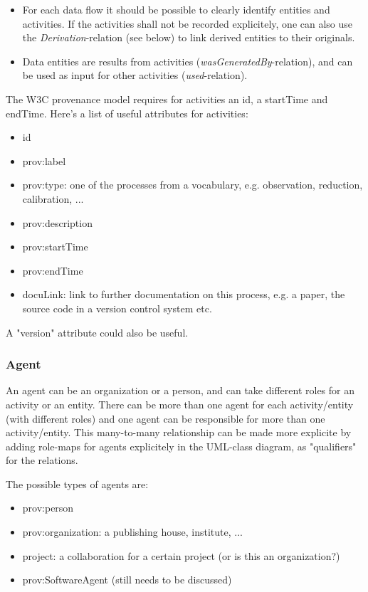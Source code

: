 \documentclass[11pt,a4paper]{ivoa}
\begin{document}
\begin{itemize}
\item For each data flow it should be possible to clearly identify entities and activities. If the activities shall not be recorded explicitely, one can also use the \emph{Derivation}-relation (see below) to link derived entities to their originals.

\item Data entities are results from activities (\emph{wasGeneratedBy}-relation), and can be used as input for other activities (\emph{used}-relation). 

\end{itemize}

The W3C provenance model requires for activities an id, a startTime and endTime. 
Here's a list of useful attributes for activities:

\begin{itemize}
\item id
\item prov:label
\item prov:type: one of the processes from a vocabulary, e.g. observation, reduction, calibration, ... 
\item prov:description
\item prov:startTime
\item prov:endTime
\item docuLink: link to further documentation on this process, e.g. a paper, the source code in a version control system etc.
\end{itemize}

A "version" attribute could also be useful.




\subsubsection{Agent}
An agent can be an organization or a person, and can take different roles for an activity or an entity. 
There can be more than one agent for each activity/entity (with different roles) and one agent can be responsible for more than one activity/entity. This many-to-many relationship can be made more explicite by adding role-maps for agents explicitely in the UML-class diagram, as "qualifiers" 
for the relations. 

The possible types of agents are:
\begin{itemize}
\item prov:person
\item prov:organization: a publishing house, institute, ...
\item project: a collaboration for a certain project (or is this an organization?)
\item prov:SoftwareAgent (still needs to be discussed)
\end{itemize}
\end{document}
